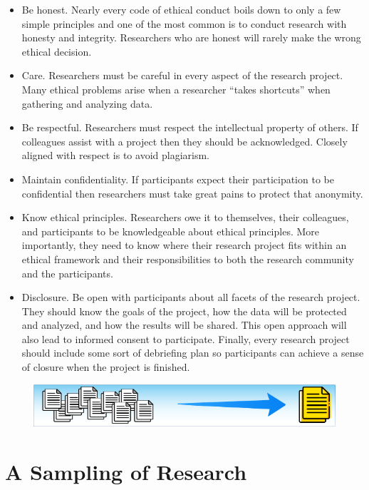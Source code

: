 \begin{itemize}

	\item Be honest. Nearly every code of ethical conduct boils down to only a few simple principles and one of the most common is to conduct research with honesty and integrity. Researchers who are honest will rarely make the wrong ethical decision.
	\item Care. Researchers must be careful in every aspect of the research project. Many ethical problems arise when a researcher ``takes shortcuts'' when gathering and analyzing data.
	\item Be respectful. Researchers must respect the intellectual property of others. If colleagues assist with a project then they should be acknowledged. Closely aligned with respect is to avoid plagiarism.
	\item Maintain confidentiality. If participants expect their participation to be confidential then researchers must take great pains to protect that anonymity.  
	\item Know ethical principles. Researchers owe it to themselves, their colleagues, and participants to be knowledgeable about ethical principles. More importantly, they need to know where their research project fits within an ethical framework and their responsibilities to both the research community and the participants.
	\item Disclosure. Be open with participants about all facets of the research project. They should know the goals of the project, how the data will be protected and analyzed, and how the results will be shared. This open approach will also lead to informed consent to participate. Finally, every research project should include some sort of debriefing plan so participants can achieve a sense of closure when the project is finished.
\end{itemize}

\noindent\begin{minipage}{\textwidth}
	\begin{figure}[H]
		\centering
		\includegraphics[width=.85\linewidth]{gfx/Sampling_Of_Research}
		\caption*{}
		\label{03:sampling_of_research}
	\end{figure}
	\vspace{-10.0ex} %
	\section{A Sampling of Research}
\end{minipage}

